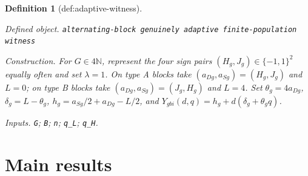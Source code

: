 \documentclass{article}
\newtheorem{definition}{Definition}
\begin{document}
\begin{definition}[def:adaptive-witness]\label{def:adaptive-witness}
\par\smallskip\noindent\emph{Defined object.} \texttt{alternating-\allowbreak{}block genuinely adaptive finite-\allowbreak{}population witness}
\par\smallskip\noindent\emph{Construction.} For \(G\in4\mathbb N\), represent the four sign pairs \((H_g,J_g)\in\{-1,1\}^2\) equally often and set \(\lambda=1\). On type A blocks take \((a_{Dg},a_{Sg})=(H_g,J_g)\) and \(L=0\); on type B blocks take \((a_{Dg},a_{Sg})=(J_g,H_g)\) and \(L=4\). Set \(\theta_g=4a_{Dg}\), \(\delta_g=L-\theta_g\), \(h_g=a_{Sg}/2+a_{Dg}-L/2\), and \(Y_{gbi}(d,q)=h_g+d(\delta_g+\theta_gq)\).
\par\smallskip\noindent\emph{Inputs.} \texttt{G}; \texttt{B}; \texttt{n}; \texttt{q\_\allowbreak{}L}; \texttt{q\_\allowbreak{}H}.
\end{definition}

\section{Main results}
\end{document}
